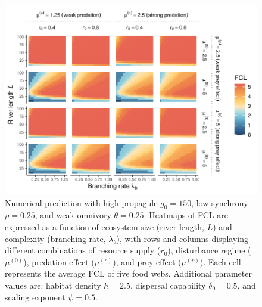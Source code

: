 \begin{figure}
\centering
\includegraphics{../data_fmt/fig_rho025_g150_theta025.pdf}
\caption{\label{fig:fig-num2}Numerical prediction with high propagule
\(g_0 = 150\), low synchrony \(\rho = 0.25\), and weak omnivory
\(\theta = 0.25\). Heatmaps of FCL are expressed as a function of
ecosystem size (river length, \(L\)) and complexity (branching rate,
\(\lambda_b\)), with rows and columns displaying different combinations
of resource supply (\(r_0\)), disturbance regime (\(\mu^{(0)}\)),
predation effect (\(\mu^{(c)}\)), and prey effect (\(\mu^{(p)}\)). Each
cell represents the average FCL of five food webs. Additional parameter
values are: habitat density \(h=2.5\), dispersal capability
\(\delta_0=0.5\), and scaling exponent \(\psi=0.5\).}
\end{figure}

\newpage

